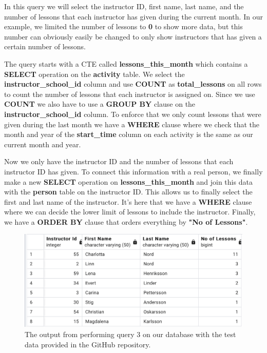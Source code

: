 \documentclass[a4paper]{scrartcl}
\begin{document}
In this query we will select the instructor ID, first name, last name, and the number of lessons that each instructor has given during the current month. In our example, we limited the number of lessons to \textbf{0} to show more data, but this number can obviously easily be changed to only show instructors that has given a certain number of lessons.

The query starts with a CTE called \textbf{lessons\_this\_month} which contains a \textbf{SELECT} operation on the \textbf{activity} table. We select the \textbf{instructor\_school\_id} column and use \textbf{COUNT} as \textbf{total\_lessons} on all rows to count the number of lessons that each instructor is assigned on. Since we use \textbf{COUNT} we also have to use a \textbf{GROUP BY} clause on the \textbf{instructor\_school\_id} column. To enforce that we only count lessons that were given during the last month we have a \textbf{WHERE} clause where we check that the month and year of the \textbf{start\_time} column on each activity is the same as our current month and year.

Now we only have the instructor ID and the number of lessons that each instructor ID has given. To connect this information with a real person, we finally make a new \textbf{SELECT} operation on \textbf{lessons\_this\_month} and join this data with the \textbf{person} table on the instructor ID. This allows us to finally select the first and last name of the instructor. It's here that we have a \textbf{WHERE} clause where we can decide the lower limit of lessons to include the instructor. Finally, we have a \textbf{ORDER BY} clause that orders everything by \textbf{"No of Lessons"}.

\begin{figure}[H]
    \begin{center}
      \includegraphics[scale=0.6]{query3_output.png}
      \caption{The output from performing query 3 on our database with the test data provided in the GitHub repository.}
      \label{fig:diag}
    \end{center}
  \end{figure}
\end{document}
